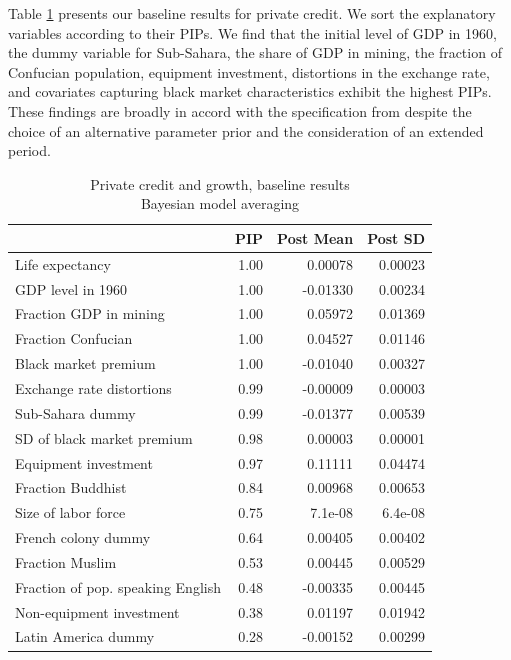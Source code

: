 \begin{refsection}
Table \ref{ch2tab:PC6011hyp} presents our baseline results for private credit. We sort the explanatory variables according to their \acp{PIP}. We find that the initial level of \ac{GDP} in 1960, the dummy variable for Sub-Sahara, the share of GDP in mining, the fraction of Confucian population, equipment investment, distortions in the exchange rate, and covariates capturing black market characteristics exhibit the highest \acp{PIP}. These findings are broadly in accord with the specification from \textcite{Fernandezetal2001} despite the choice of an alternative parameter prior and the consideration of an extended period. 
%
\begin{table}[!ht]
	\centering
	\caption{Private credit and growth, baseline results\\
		Bayesian model averaging}
	\label{ch2tab:PC6011hyp}
	\small
	\begin{tabular}{lrrr}
		\toprule
		& PIP & Post Mean & Post SD \\ 
		\toprule
		Life expectancy & 1.00 & 0.00078 & 0.00023 \\ 
		GDP level in 1960 & 1.00 & -0.01330 & 0.00234 \\ 
		Fraction GDP in mining & 1.00 & 0.05972 & 0.01369 \\ 
		Fraction Confucian & 1.00 & 0.04527 & 0.01146 \\ 
		Black market premium & 1.00 & -0.01040 & 0.00327 \\ 
		Exchange rate distortions & 0.99 & -0.00009 & 0.00003 \\ 
		Sub-Sahara dummy & 0.99 & -0.01377 & 0.00539 \\ 
		SD of black market premium & 0.98 & 0.00003 & 0.00001 \\ 
		Equipment investment & 0.97 & 0.11111 & 0.04474 \\ 
		Fraction Buddhist & 0.84 & 0.00968 & 0.00653 \\ 
		Size of labor force & 0.75 & 7.1e-08 & 6.4e-08 \\ 
		French colony dummy & 0.64 & 0.00405 & 0.00402 \\ 
		Fraction Muslim & 0.53 & 0.00445 & 0.00529 \\ 
		Fraction of pop. speaking English & 0.48 & -0.00335 & 0.00445 \\ 
		Non-equipment investment & 0.38 & 0.01197 & 0.01942 \\ 
		Latin America dummy & 0.28 & -0.00152 & 0.00299 \\ 

\end{tabular}
\end{table}
\end{refsection}
